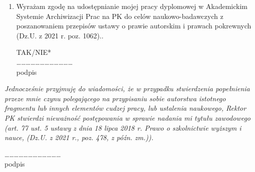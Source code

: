 \begin{small}
\begin{enumerate}
\item Wyrażam zgodę na udostępnianie mojej pracy dyplomowej w Akademickim Systemie Archiwizacji Prac na PK do celów naukowo-badawczych z poszanowaniem przepisów ustawy o prawie autorskim i prawach pokrewnych (Dz.U. z 2021 r. poz. 1062)..

 
\begin{flushright}
TAK/NIE* \\
………………………………\\
podpis
\end{flushright}

\end{enumerate}
\textit{Jednocześnie przyjmuję do wiadomości, że w przypadku stwierdzenia popełnienia przeze mnie czynu polegającego na przypisaniu sobie autorstwa istotnego fragmentu lub innych elementów cudzej pracy, lub ustalenia naukowego, Rektor PK stwierdzi nieważność postępowania w sprawie nadania mi tytułu zawodowego (art. 77 ust. 5 ustawy z dnia 18 lipca 2018 r. Prawo o szkolnictwie wyższym i nauce, (Dz.U. z 2021 r., poz. 478, z późn. zm.)).}

\begin{flushright}
……………………………… \\
podpis
\end{flushright}
\end{small}

\endgroup

\afterpage{\blankpage}